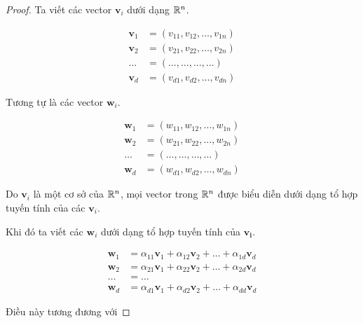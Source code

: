 \begin{proof}
    Ta viết các vector $\bm{v}_i$ dưới dạng $\mathbb{R}^n$.

    \begin{align*}
        \bm{v}_1 & = (v_{11}, v_{12}, \ldots, v_{1n}) \\
        \bm{v}_2 & = (v_{21}, v_{22}, \ldots, v_{2n}) \\
        \ldots & = (\ldots, \ldots, \ldots, \ldots) \\
        \bm{v}_d & = (v_{d1}, v_{d2}, \ldots, v_{dn})
    \end{align*}

    Tương tự là các vector $\bm{w}_i$.

    \begin{align*}
        \bm{w}_1 & = (w_{11}, w_{12}, \ldots, w_{1n}) \\
        \bm{w}_2 & = (w_{21}, w_{22}, \ldots, w_{2n}) \\
        \ldots & = (\ldots, \ldots, \ldots, \ldots) \\
        \bm{w}_d & = (w_{d1}, w_{d2}, \ldots, w_{dn})
    \end{align*}

    Do $\bm{v}_i$ là một cơ sở của $\mathbb{R}^n$, mọi vector trong $\mathbb{R}^n$ được biểu diễn dưới dạng tổ hợp tuyến tính của các $\bm{v}_i$.

    Khi đó ta viết các $\bm{w}_i$ dưới dạng tổ hợp tuyến tính của $\bm{v_i}$.

    \begin{align*}
        \bm{w}_1 & = \alpha_{11} \bm{v}_1 + \alpha_{12} \bm{v}_2 + \ldots + \alpha_{1d} \bm{v}_d \\
        \bm{w}_2 & = \alpha_{21} \bm{v}_1 + \alpha_{22} \bm{v}_2 + \ldots + \alpha_{2d} \bm{v}_d \\
        \ldots & = \ldots \\
        \bm{w}_d & = \alpha_{d1} \bm{v}_1 + \alpha_{d2} \bm{v}_2 + \ldots + \alpha_{dd} \bm{v}_d
    \end{align*}

    Điều này tương đương với 


\end{proof}
